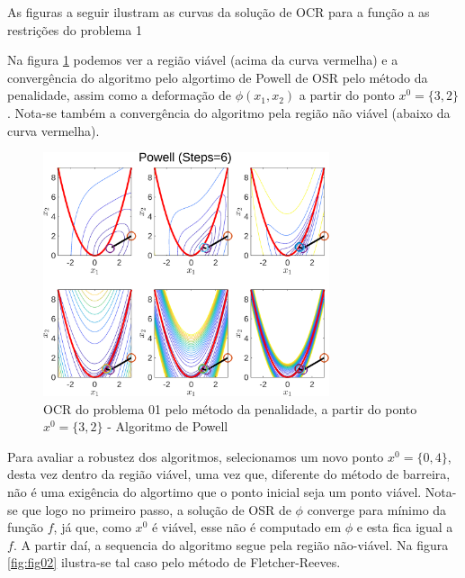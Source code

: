 \documentclass[10pt, a4paper]{article}
\begin{document}

As figuras a seguir ilustram as curvas da solu\c c\~ao de OCR para a fun\c c\~ao a as restri\c c\~oes do problema 1

Na figura \ref{fig:fig01} podemos ver a regi\~ao vi\'avel (acima da curva vermelha) e a converg\^encia do algoritmo pelo algortimo de Powell de OSR pelo m\'etodo da penalidade, assim como a deforma\c c\~ao de $\phi(x_1,x_2)$ a partir do ponto $x^0=\{3,2\}$. Nota-se tamb\'em a converg\^encia do algoritmo pela regi\~ao n\~ao vi\'avel (abaixo da curva vermelha).

\begin{figure}[H]
      \centering
      \includegraphics[width=0.75\textwidth]{fig01_P01_PEN_X1_POW.png}
      \caption{OCR do problema 01 pelo m\'etodo da penalidade, a partir do ponto $x^0=\{3,2\}$ - Algoritmo de Powell}
      \label{fig:fig01}
\end{figure}

Para avaliar a robustez dos algoritmos, selecionamos um novo ponto $x^0=\{0,4\}$, desta vez dentro da regi\~ao vi\'avel, uma vez que, diferente do m\'etodo de barreira, n\~ao \'e uma exig\^encia do algortimo que o ponto inicial seja um ponto vi\'avel. Nota-se que logo no primeiro passo, a solu\c c\~ao de OSR de $\phi$ converge para m\'inimo da fun\c c\~ao $f$, j\'a que, como $x^0$ \'e vi\'avel, esse n\~ao \'e computado em $\phi$ e esta fica igual a $f$. A partir da\'i, a sequencia do algoritmo segue pela regi\~ao n\~ao-vi\'avel. Na figura \ref{fig:fig02} ilustra-se tal caso pelo m\'etodo de Fletcher-Reeves.
\end{document}

